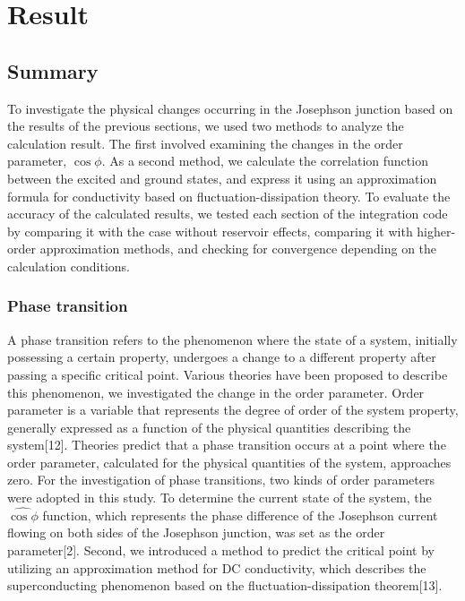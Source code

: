 \documentclass{article}[12pt]
\begin{document}
\section{Result}
\begin{spacing}{1.5}
\subsection{Summary}
  To investigate the physical changes occurring in the Josephson junction based on the results of the previous sections,  
  we used two methods to analyze the calculation result. The first involved examining the changes in the order parameter, $\cos{\phi}$. 
  As a second method, we calculate the correlation function between the excited and ground states, and express it using an approximation formula for conductivity based on fluctuation-dissipation theory. 
  To evaluate the accuracy of the calculated results, 
  we tested each section of the integration code by comparing it with the case without reservoir effects, 
  comparing it with higher-order approximation methods, and checking for convergence depending on the calculation conditions.

  \subsubsection*{Phase transition}
A phase transition refers to the phenomenon where the state of a system, initially possessing a certain property, 
undergoes a change to a different property after passing a specific critical point. Various theories have been 
proposed to describe this phenomenon, we investigated the change in the order parameter. 
Order parameter is a variable that represents the degree of order of the system property, 
generally expressed as a function of the physical quantities describing the system[12]. 
Theories predict that a phase transition occurs at a point where the order parameter, 
calculated for the physical quantities of the system, approaches zero.
For the investigation of phase transitions, two kinds of order parameters were adopted in this study. 
To determine the current state of the system, the $\hat{\cos\phi}$ function, 
which represents the phase difference of the Josephson current flowing on both sides of the Josephson junction, 
was set as the order parameter[2]. Second, we introduced a method to predict 
the critical point by utilizing an approximation method for DC conductivity, 
which describes the superconducting phenomenon based on the fluctuation-dissipation theorem[13].
\pagebreak

\end{spacing}
\end{document}
